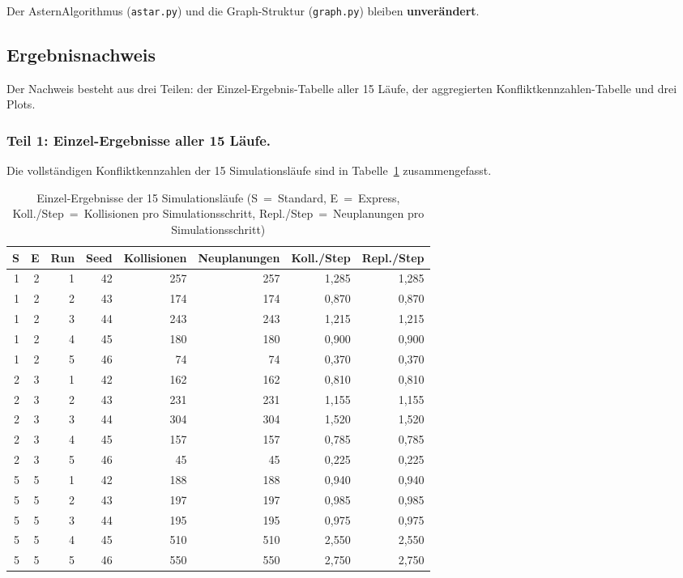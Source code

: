 Der \acs{Astern}Algorithmus (\texttt{astar.py}) und die Graph-Struktur (\texttt{graph.py}) bleiben \textbf{unverändert}.


\subsection{Ergebnisnachweis}
\label{sssec:konflikte_5d_nachweis}

Der Nachweis besteht aus drei Teilen: der Einzel-Ergebnis-Tabelle aller 15 Läufe, der aggregierten Konfliktkennzahlen-Tabelle und drei Plots.

\subsubsection{Teil 1: Einzel-Ergebnisse aller 15 Läufe.}
Die vollständigen Konfliktkennzahlen der 15 Simulationsläufe sind in Tabelle~\ref{tab:raw_5d} zusammengefasst.

\begin{table}[H]
    \centering
    \small
    \begin{tabular}{r r r r r r r r}
        \toprule
        \textbf{S} & \textbf{E} & \textbf{Run} & \textbf{Seed} & \textbf{Kollisionen} & \textbf{Neuplanungen} & \textbf{Koll./Step} & \textbf{Repl./Step} \\
        \midrule
        1 & 2 & 1 & 42 & 257 & 257 & 1{,}285 & 1{,}285 \\
        1 & 2 & 2 & 43 & 174 & 174 & 0{,}870 & 0{,}870 \\
        1 & 2 & 3 & 44 & 243 & 243 & 1{,}215 & 1{,}215 \\
        1 & 2 & 4 & 45 & 180 & 180 & 0{,}900 & 0{,}900 \\
        1 & 2 & 5 & 46 & 74  & 74  & 0{,}370 & 0{,}370 \\
        \midrule
        2 & 3 & 1 & 42 & 162 & 162 & 0{,}810 & 0{,}810 \\
        2 & 3 & 2 & 43 & 231 & 231 & 1{,}155 & 1{,}155 \\
        2 & 3 & 3 & 44 & 304 & 304 & 1{,}520 & 1{,}520 \\
        2 & 3 & 4 & 45 & 157 & 157 & 0{,}785 & 0{,}785 \\
        2 & 3 & 5 & 46 & 45  & 45  & 0{,}225 & 0{,}225 \\
        \midrule
        5 & 5 & 1 & 42 & 188 & 188 & 0{,}940 & 0{,}940 \\
        5 & 5 & 2 & 43 & 197 & 197 & 0{,}985 & 0{,}985 \\
        5 & 5 & 3 & 44 & 195 & 195 & 0{,}975 & 0{,}975 \\
        5 & 5 & 4 & 45 & 510 & 510 & 2{,}550 & 2{,}550 \\
        5 & 5 & 5 & 46 & 550 & 550 & 2{,}750 & 2{,}750 \\
        \bottomrule
    \end{tabular}
    \caption{Einzel-Ergebnisse der 15 Simulationsläufe (S~=~Standard, E~=~Express, Koll./Step~=~Kollisionen pro Simulationsschritt, Repl./Step~=~Neuplanungen pro Simulationsschritt)}
    \label{tab:raw_5d}
\end{table}

